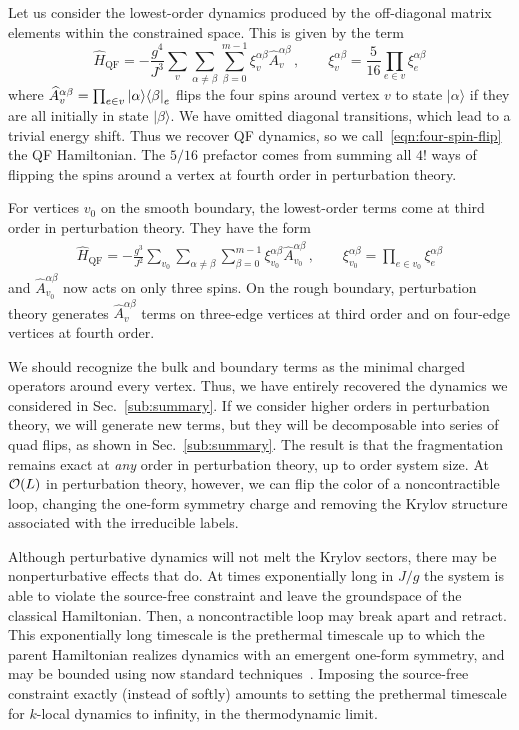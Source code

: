 Let us consider the lowest-order dynamics produced by the off-diagonal matrix elements within the constrained space. This is given by the term
%
%
\begin{equation}
    \hat{H}_{\text{QF}} = - \frac{g^4}{J^3}\sum_{v} \sum_{\alpha \ne \beta} \sum_{\beta=0}^{m-1} \xi_v^{\alpha\beta}  \hat{A}_v^{\alpha \beta} 
    \, ,
    \qquad
    \xi_v^{\alpha \beta} = \frac{5}{16} \prod_{e \in v} \xi_e^{\alpha \beta}
    \label{eqn:four-spin-flip}
\end{equation}
%
%
where $\hat{A}_v^{\alpha \beta} = \prod_{e\in v} \ketbra{\alpha}{\beta}_e $ flips the four spins around vertex $v$ to state $|\alpha \rangle$ if they are all initially in state $|\beta\rangle$. We have omitted diagonal transitions, which lead to a trivial energy shift. Thus we recover QF dynamics, so we call~\eqref{eqn:four-spin-flip} the QF Hamiltonian. The $5/16$ prefactor comes from summing all $4!$ ways of flipping the spins around a vertex at fourth order in perturbation theory. 

For vertices $v_0$ on the smooth boundary, the lowest-order terms come at third order in perturbation theory. They have the form 
\begin{align}
    \hat{H}_{\text{QF}} = - \frac{g^3}{J^2}\sum_{v_0} \sum_{\alpha \ne \beta} \sum_{\beta=0}^{m-1}\xi_{v_0}^{\alpha\beta}  \hat{A}_{v_0}^{\alpha \beta} 
    \, ,
    \qquad
    \xi_{v_0}^{\alpha \beta} = \prod_{e \in v_0} \xi_e^{\alpha \beta}
\end{align}
and $\hat{A}_{v_0}^{\alpha \beta}$ now acts on only three spins. On the rough boundary, perturbation theory generates $\hat{A}_v^{\alpha \beta}$ terms on three-edge vertices at third order and on four-edge vertices at fourth order.

We should recognize the bulk and boundary terms as the minimal charged operators around every vertex. Thus, we have entirely recovered the dynamics we considered in Sec.~\ref{sub:summary}. If we consider higher orders in perturbation theory, we will generate new terms, but they will be decomposable into series of quad flips, as shown in Sec.~\ref{sub:summary}. The result is that the fragmentation remains exact at \emph{any} order in perturbation theory, up to order system size. At $\cal{O}(L)$ in perturbation theory, however, we can flip the color of a noncontractible loop, changing the one-form symmetry charge and removing the Krylov structure associated with the irreducible labels. 

Although perturbative dynamics will not melt the Krylov sectors, there may be nonperturbative effects that do. At times exponentially long in $J/g$ the system is able to violate the source-free constraint and leave the groundspace of the classical Hamiltonian. Then, a noncontractible loop may break apart and retract. This exponentially long timescale is the prethermal timescale up to which the parent Hamiltonian realizes dynamics with an emergent one-form symmetry, and may be bounded using now standard techniques~\cite{Abanin2017Rigorous}. Imposing the source-free constraint exactly (instead of softly) amounts to setting the prethermal timescale for $k$-local dynamics to infinity, in the thermodynamic limit.  

